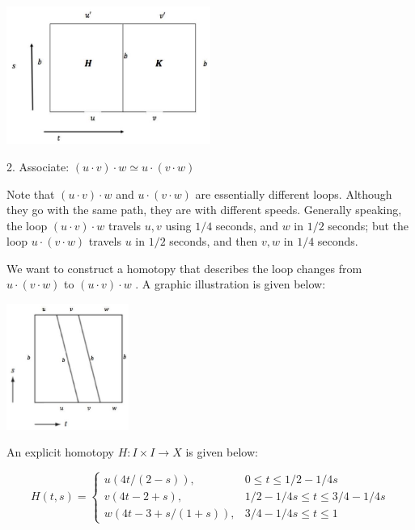 \begin{center}
\includegraphics[max width=0.5\textwidth]{images/bo_d2bcsrref24c73avs720_115_639_1586_617_417_0.jpg}
\end{center}
\hspace*{3em} 

2. Associate: \(\left( {u \cdot  v}\right)  \cdot  w \simeq  u \cdot  \left( {v \cdot  w}\right)\)

Note that \(\left( {u \cdot  v}\right)  \cdot  w\) and \(u \cdot  \left( {v \cdot  w}\right)\) are essentially different loops. Although they go with the same path, they are with different speeds. Generally speaking, the loop \(\left( {u \cdot  v}\right)  \cdot  w\) travels \(u,v\) using \(1/4\) seconds, and \(w\) in \(1/2\) seconds; but the loop \(u \cdot  \left( {v \cdot  w}\right)\) travels \(u\) in \(1/2\) seconds, and then \(v,w\) in \(1/4\) seconds.

We want to construct a homotopy that describes the loop changes from \(u \cdot  \left( {v \cdot  w}\right)\) to \(\left( {u \cdot  v}\right)  \cdot  w\) . A graphic illustration is given below:

\begin{center}
\includegraphics[max width=0.3\textwidth]{images/bo_d2bcsrref24c73avs720_116_621_761_407_419_0.jpg}
\end{center}
\hspace*{3em} 

An explicit homotopy \(H : I \times  I \rightarrow  X\) is given below:

\[
H\left( {t,s}\right)  = \left\{  \begin{matrix} u\left( {{4t}/\left( {2 - s}\right) }\right) , & 0 \leq  t \leq  1/2 - 1/{4s} \\  v\left( {{4t} - 2 + s}\right) , & 1/2 - 1/{4s} \leq  t \leq  3/4 - 1/{4s} \\  w\left( {{4t} - 3 + s/\left( {1 + s}\right) }\right) , & 3/4 - 1/{4s} \leq  t \leq  1 \end{matrix}\right.
\]

